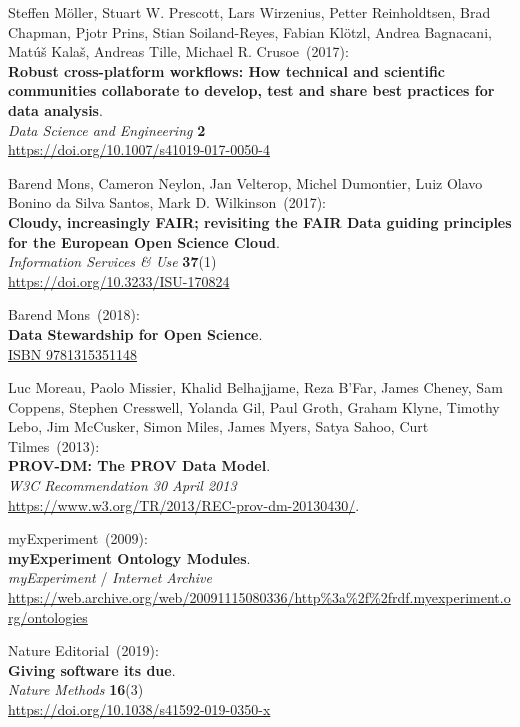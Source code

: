 \begin{thebibliography}{9}
Steffen Möller, Stuart W. Prescott, Lars Wirzenius, Petter
Reinholdtsen, Brad Chapman, Pjotr Prins, Stian Soiland-Reyes, Fabian
Klötzl, Andrea Bagnacani, Matúš Kalaš, Andreas Tille, Michael R. Crusoe~(2017): \\
\textbf{Robust cross-platform workflows: How technical and scientific
communities collaborate to develop, test and share best practices for
data analysis}.\\
\emph{Data Science and Engineering} \textbf{2}\\
\url{https://doi.org/10.1007/s41019-017-0050-4}

Barend Mons, Cameron Neylon, Jan Velterop, Michel
Dumontier, Luiz Olavo Bonino da Silva Santos, Mark D. Wilkinson~(2017): \\
\textbf{Cloudy, increasingly FAIR; revisiting the FAIR Data guiding
principles for the European Open Science Cloud}.\\
\emph{Information Services \& Use} \textbf{37}(1)\\
\url{https://doi.org/10.3233/ISU-170824}

Barend Mons~(2018): \\
\textbf{Data Stewardship for Open Science}.\\
\href{https://identifiers.org/isbn/9781315351148}{ISBN 9781315351148}

Luc Moreau, Paolo Missier, Khalid Belhajjame, Reza B'Far, James Cheney, Sam Coppens, Stephen Cresswell, Yolanda Gil, Paul Groth, Graham Klyne, Timothy Lebo, Jim McCusker, Simon Miles, James Myers, Satya Sahoo, Curt Tilmes~(2013): \\
\textbf{PROV-DM: The PROV Data Model}. \\
\emph{W3C Recommendation 30 April 2013}\\
\url{https://www.w3.org/TR/2013/REC-prov-dm-20130430/}.

myExperiment~(2009): \\
\textbf{myExperiment Ontology Modules}.\\
\emph{myExperiment} / \emph{Internet Archive}\\
\url{https://web.archive.org/web/20091115080336/http\%3a\%2f\%2frdf.myexperiment.org/ontologies}

Nature Editorial~(2019): \\
\textbf{Giving software its due}.\\
\emph{Nature Methods} \textbf{16}(3)\\
\url{https://doi.org/10.1038/s41592-019-0350-x}


\end{thebibliography}

